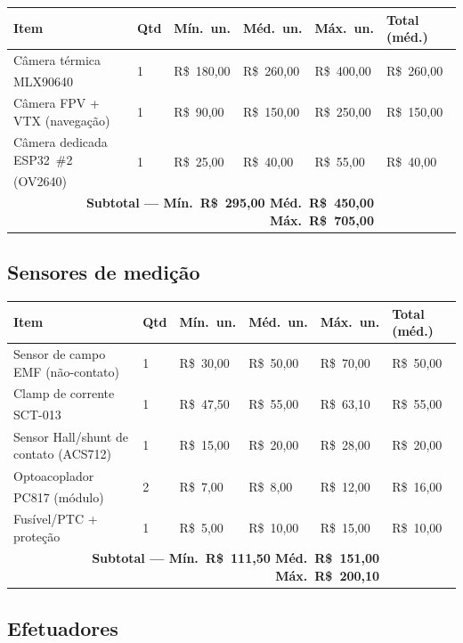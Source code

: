 \documentclass[11pt,a4paper]{article}
\newcommand{\pesq}{\textsuperscript{\textdagger}}
\begin{document}
\begin{longtable}{@{}p{5.4cm}p{0.9cm}p{1.7cm}p{1.7cm}p{1.7cm}p{2.1cm}@{}}
\toprule
\textbf{Item} & \textbf{Qtd} & \textbf{Mín.\ un.} & \textbf{Méd.\ un.} & \textbf{Máx.\ un.} & \textbf{Total (méd.)} \\
\midrule
\endhead
\bottomrule
\endfoot
Câmera térmica MLX90640\pesq & 1 & R\$~180,00 & R\$~260,00 & R\$~400,00 & R\$~260,00 \\
Câmera FPV + VTX (navegação) & 1 & R\$~90,00 & R\$~150,00 & R\$~250,00 & R\$~150,00 \\
Câmera dedicada ESP32~\#2 (OV2640)\pesq & 1 & R\$~25,00 & R\$~40,00 & R\$~55,00 & R\$~40,00 \\
\midrule
\multicolumn{5}{r}{\textbf{Subtotal — Mín.\ R\$~295,00 \quad Méd.\ R\$~450,00 \quad Máx.\ R\$~705,00}} & \\
\end{longtable}

\subsection{Sensores de medição}

\begin{longtable}{@{}p{5.4cm}p{0.9cm}p{1.7cm}p{1.7cm}p{1.7cm}p{2.1cm}@{}}
\toprule
\textbf{Item} & \textbf{Qtd} & \textbf{Mín.\ un.} & \textbf{Méd.\ un.} & \textbf{Máx.\ un.} & \textbf{Total (méd.)} \\
\midrule
\endhead
\bottomrule
\endfoot
Sensor de campo EMF (não-contato) & 1 & R\$~30,00 & R\$~50,00 & R\$~70,00 & R\$~50,00 \\
Clamp de corrente SCT-013\pesq & 1 & R\$~47,50 & R\$~55,00 & R\$~63,10 & R\$~55,00 \\
Sensor Hall/shunt de contato (ACS712) & 1 & R\$~15,00 & R\$~20,00 & R\$~28,00 & R\$~20,00 \\
Optoacoplador PC817 (módulo)\pesq & 2 & R\$~7,00 & R\$~8,00 & R\$~12,00 & R\$~16,00 \\
Fusível/PTC + proteção & 1 & R\$~5,00 & R\$~10,00 & R\$~15,00 & R\$~10,00 \\
\midrule
\multicolumn{5}{r}{\textbf{Subtotal — Mín.\ R\$~111,50 \quad Méd.\ R\$~151,00 \quad Máx.\ R\$~200,10}} & \\
\end{longtable}

\subsection{Efetuadores}
\end{document}
